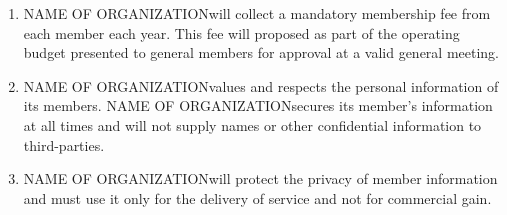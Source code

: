 \documentclass[12pt]{article}
\newcommand{\orgname}{NAME OF ORGANIZATION\space}
\begin{document}
\begin{enumerate}[{3}.1]
\begin{enumerate}[{3.4}.1]
        \item	Respect the rights of peers and fellow members;
        \item	Abide by University of Toronto policies, procedures, and guidelines;
        \item	Abide by the Laws of the Land, including but not limited to the Criminal Code of Canada. 
    \end{enumerate}
    \item \orgname will collect a mandatory membership fee from each member each year. This fee will proposed as part of the operating budget presented to general members for approval at a valid general meeting. 
    \item \orgname values and respects the personal information of its members. \orgname secures its member’s information at all times and will not supply names or other confidential information to third-parties. 
    \item \orgname will protect the privacy of member information and must use it only for the delivery of service and not for commercial gain.
\end{enumerate}


\end{document}
